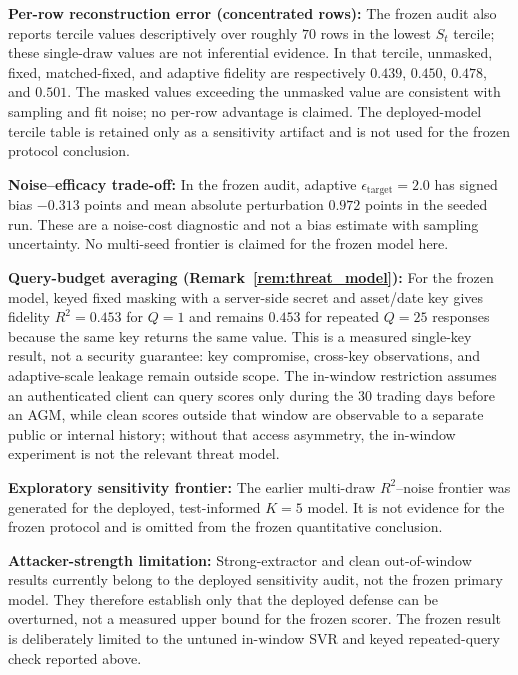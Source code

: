 \documentclass[pdflatex,sn-mathphys-num]{sn-jnl}
\theoremstyle{thmstyleone}
\theoremstyle{thmstyletwo}
\theoremstyle{thmstylethree}
\begin{document}
\noindent\textbf{Per-row reconstruction error (concentrated rows):} The frozen audit also reports tercile values descriptively over roughly $70$ rows in the lowest $S_t$ tercile; these single-draw values are not inferential evidence. In that tercile, unmasked, fixed, matched-fixed, and adaptive fidelity are respectively $0.439$, $0.450$, $0.478$, and $0.501$. The masked values exceeding the unmasked value are consistent with sampling and fit noise; no per-row advantage is claimed. The deployed-model tercile table is retained only as a sensitivity artifact and is not used for the frozen protocol conclusion.

\noindent\textbf{Noise--efficacy trade-off:} In the frozen audit, adaptive $\epsilon_{\mathrm{target}}=2.0$ has signed bias $-0.313$ points and mean absolute perturbation $0.972$ points in the seeded run. These are a noise-cost diagnostic and not a bias estimate with sampling uncertainty. No multi-seed frontier is claimed for the frozen model here.

\noindent\textbf{Query-budget averaging (Remark~\ref{rem:threat_model}):} For the frozen model, keyed fixed masking with a server-side secret and asset/date key gives fidelity $R^2=0.453$ for $Q=1$ and remains $0.453$ for repeated $Q=25$ responses because the same key returns the same value. This is a measured single-key result, not a security guarantee: key compromise, cross-key observations, and adaptive-scale leakage remain outside scope. The in-window restriction assumes an authenticated client can query scores only during the 30 trading days before an AGM, while clean scores outside that window are observable to a separate public or internal history; without that access asymmetry, the in-window experiment is not the relevant threat model.

\noindent\textbf{Exploratory sensitivity frontier:} The earlier multi-draw $R^2$--noise frontier was generated for the deployed, test-informed $K=5$ model. It is not evidence for the frozen protocol and is omitted from the frozen quantitative conclusion.

\noindent\textbf{Attacker-strength limitation:} Strong-extractor and clean out-of-window results currently belong to the deployed sensitivity audit, not the frozen primary model. They therefore establish only that the deployed defense can be overturned, not a measured upper bound for the frozen scorer. The frozen result is deliberately limited to the untuned in-window SVR and keyed repeated-query check reported above.
\end{document}
